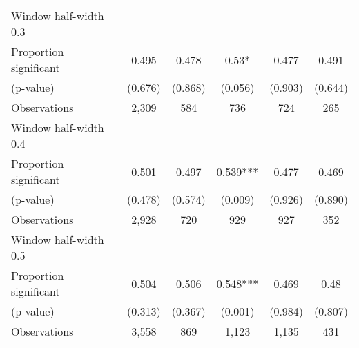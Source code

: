 \begin{tabular}{l*{5}{c}}
\hline
Window half-width 0.3\\

Proportion significant& 0.495 &  0.478 &  0.53* &  0.477 &  0.491\\

(p-value) & (0.676) &  (0.868) &  (0.056) &  (0.903) &  (0.644)\\

Observations& 2,309 &  584 &  736 &  724 &  265\\

\hline
Window half-width 0.4\\

Proportion significant& 0.501 &  0.497 &  0.539*** &  0.477 &  0.469\\

(p-value) & (0.478) &  (0.574) &  (0.009) &  (0.926) &  (0.890)\\

Observations& 2,928 &  720 &  929 &  927 &  352\\

\hline
Window half-width 0.5\\

Proportion significant& 0.504 &  0.506 &  0.548*** &  0.469 &  0.48\\

(p-value) & (0.313) &  (0.367) &  (0.001) &  (0.984) &  (0.807)\\

Observations& 3,558 &  869 &  1,123 &  1,135 &  431\\

\hline\hline
\end{tabular}

